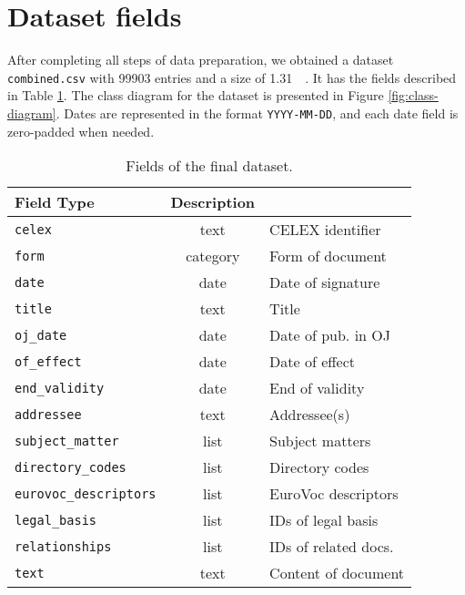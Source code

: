 \documentclass[sigconf, authorversion]{acmart}
\begin{document}
\section{Dataset fields}
\label{sec:dataset-fields}

After completing all steps of data preparation, we obtained a dataset \texttt{combined.csv} with \SI{99903}{} entries and a size of \SI{1.31}{\giga\byte}. It has the fields described in Table \ref{tab:fields}.
The class diagram for the dataset is presented in Figure \ref{fig:class-diagram}.
Dates are represented in the format \texttt{YYYY-MM-DD}, and each date field is zero-padded when needed.

\begin{table}[ht]
    \centering
    \caption{Fields of the final dataset.} \label{tab:fields}
    \begin{tabular}{@{}l|c|l@{}}
        \textbf{Field}               \textbf{Type}   & \textbf{Description}    \\ \hline
        \texttt{celex}                  & text            & CELEX identifier        \\
        \texttt{form}                   & category        & Form of document        \\
        \texttt{date}                   & date            & Date of signature       \\
        \texttt{title}                  & text            & Title                   \\
        \texttt{oj\_date}               & date            & Date of pub. in OJ      \\
        \texttt{of\_effect}             & date            & Date of effect          \\
        \texttt{end\_validity}          & date            & End of validity         \\
        \texttt{addressee}              & text            & Addressee(s)            \\
        \texttt{subject\_matter}        & list            & Subject matters         \\
        \texttt{directory\_codes}       & list            & Directory codes         \\
        \texttt{eurovoc\_descriptors}   & list            & EuroVoc descriptors     \\
        \texttt{legal\_basis}           & list            & IDs of legal basis      \\
        \texttt{relationships}          & list            & IDs of related docs.    \\
        \texttt{text}                   & text            & Content of document     \\
    \end{tabular}
\end{table}
\end{document}
